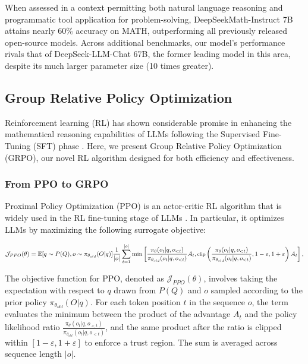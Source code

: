\begin{itemize}[topsep=0pt]
\begin{itemize}[topsep=0pt]
When assessed in a context permitting both natural language reasoning and programmatic tool application for problem-solving, DeepSeekMath-Instruct 7B attains nearly 60\% accuracy on MATH, outperforming all previously released open-source models. Across additional benchmarks, our model’s performance rivals that of DeepSeek-LLM-Chat 67B, the former leading model in this area, despite its much larger parameter size (10 times greater).

\subsection{Group Relative Policy Optimization} Reinforcement learning (RL) has shown considerable promise in enhancing the mathematical reasoning capabilities of LLMs following the Supervised Fine-Tuning (SFT) phase \citep{wang2023math,wizardmath}. Here, we present Group Relative Policy Optimization (GRPO), our novel RL algorithm designed for both efficiency and effectiveness.

\subsubsection{From PPO to GRPO} Proximal Policy Optimization (PPO) \citep{schulman2017proximal} is an actor-critic RL algorithm that is widely used in the RL fine-tuning stage of LLMs \citep{ouyang2022training}. In particular, it optimizes LLMs by maximizing the following surrogate objective:

\begin{equation}
\footnotesize
    \mathcal{J}_{PPO}(\theta) = \mathbb{E}{[q \sim P(Q), o \sim \pi_{\theta_{old}}(O|q)]} \frac{1}{|o|} \sum_{t=1}^{|o|} \min \left[ \frac{\pi_\theta(o_{t} | q, o_{<t})}{\pi_{\theta_{old}}(o_{t} | q, o_{<t})} A_{t}, \text{clip} \left( \frac{\pi_\theta(o_{t} | q, o_{<t})}{\pi_{\theta_{old}}(o_{t} | q, o_{<t})}, 1 - \varepsilon, 1 + \varepsilon \right)  A_{t} \right] ,
\end{equation}

The objective function for PPO, denoted as $\mathcal{J}_{PPO}(\theta)$, involves taking the expectation with respect to $q$ drawn from $P(Q)$ and $o$ sampled according to the prior policy $\pi_{\theta_{old}}(O|q)$. For each token position $t$ in the sequence $o$, the term evaluates the minimum between the product of the advantage $A_t$ and the policy likelihood ratio $\frac{\pi_\theta(o_t | q, o_{<t})}{\pi_{\theta_{old}}(o_t | q, o_{<t})}$, and the same product after the ratio is clipped within $[1-\varepsilon, 1+\varepsilon]$ to enforce a trust region. The sum is averaged across sequence length $|o|$.


\end{itemize}
\end{itemize}

